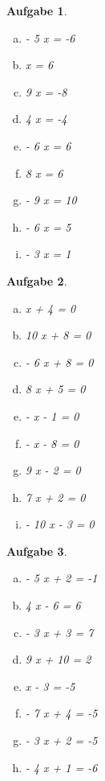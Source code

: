 \documentclass[12pt,fleqn]{article}
\theoremstyle{aufg}
\newtheorem{aufgabe}{Aufgabe}
\theoremstyle{bsp}
\begin{document}
 
    \begin{flushleft}
\begin{aufgabe} ~ \\ 
\begin{multicols}{3} 
\begin{enumerate}[a)] 
\item 
- 5 x = -6
\item 
x = 6
\item 
9 x = -8
\item 
4 x = -4
\item 
- 6 x = 6
\item 
8 x = 6
\item 
- 9 x = 10
\item 
- 6 x = 5
\item 
- 3 x = 1
\end{enumerate} 
\end{multicols} 
\end{aufgabe} 
\begin{aufgabe} ~ \\ 
\begin{multicols}{3} 
\begin{enumerate}[a)] 
\item 
x + 4 = 0
\item 
10 x + 8 = 0
\item 
- 6 x + 8 = 0
\item 
8 x + 5 = 0
\item 
- x - 1 = 0
\item 
- x - 8 = 0
\item 
9 x - 2 = 0
\item 
7 x + 2 = 0
\item 
- 10 x - 3 = 0
\end{enumerate} 
\end{multicols} 
\end{aufgabe} 
\begin{aufgabe} ~ \\ 
\begin{multicols}{3} 
\begin{enumerate}[a)] 
\item 
- 5 x + 2 = -1
\item 
4 x - 6 = 6
\item 
- 3 x + 3 = 7
\item 
9 x + 10 = 2
\item 
x - 3 = -5
\item 
- 7 x + 4 = -5
\item 
- 3 x + 2 = -5
\item 
- 4 x + 1 = -6

\end{enumerate}
\end{multicols}
\end{aufgabe}
\end{flushleft}
\end{document}
